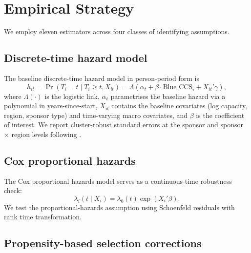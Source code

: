 \documentclass[review,authoryear,11pt]{elsarticle}
\newcommand{\BlueCCS}{\mathrm{Blue\_CCS}}
\begin{document}
\section{Empirical Strategy}

We employ eleven estimators across four classes of identifying assumptions.

\subsection{Discrete-time hazard model}

The baseline discrete-time hazard model in person-period form \citep{Allison2014, SingerWillett2003} is
\begin{equation}
  h_{it} = \Pr(T_i = t \mid T_i \geq t, X_{it}) = \Lambda\!\left(\alpha_t + \beta \cdot \BlueCCS_i + X_{it}'\gamma\right),
  \label{eq:dt_hazard}
\end{equation}
where $\Lambda(\cdot)$ is the logistic link, $\alpha_t$ parametrises the baseline hazard via a polynomial in years-since-start, $X_{it}$ contains the baseline covariates (log capacity, region, sponsor type) and time-varying macro covariates, and $\beta$ is the coefficient of interest. We report cluster-robust standard errors at the sponsor and sponsor $\times$ region levels following \citet{Wooldridge2010}.

\subsection{Cox proportional hazards}

The Cox proportional hazards model \citep{Cox1972, AndersenGill1982} serves as a continuous-time robustness check:
\begin{equation}
  \lambda_i(t \mid X_i) = \lambda_0(t)\exp(X_i'\beta).
  \label{eq:cox}
\end{equation}
We test the proportional-hazards assumption using Schoenfeld residuals \citep{Schoenfeld1982, GrambschTherneau1994} with rank time transformation.

\subsection{Propensity-based selection corrections}
\end{document}
